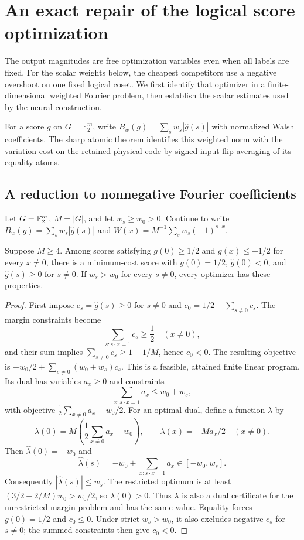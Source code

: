 \section{An exact repair of the logical score optimization}
\label{sec:repair}

The output magnitudes are free optimization variables even when all
labels are fixed. For the scalar weights below, the cheapest competitors
use a negative overshoot on one fixed logical coset. We first identify
that optimizer in a finite-dimensional weighted Fourier problem, then
establish the scalar estimates used by the neural construction.

For a score $g$ on $G=\mathbb F_2^m$, write
$B_w(g)=\sum_s w_s|\widehat g(s)|$ with normalized Walsh coefficients.
The sharp atomic theorem identifies this weighted norm with the
variation cost on the retained physical code by signed input-flip
averaging of its equality atoms.

\subsection{A reduction to nonnegative Fourier coefficients}

Let $G=\mathbb F_2^m$, $M=|G|$, and let $w_s\ge w_0>0$. Continue to write
$B_w(g)=\sum_s w_s|\widehat g(s)|$ and
$W(x)=M^{-1}\sum_s w_s(-1)^{s\cdot x}$.

\begin{lemma}\label{lem:positive-coeff}
Suppose $M\ge4$. Among scores satisfying $g(0)\ge1/2$ and
$g(x)\le-1/2$ for every $x\ne0$, there is a minimum-cost score with
$g(0)=1/2$, $\widehat g(0)<0$, and $\widehat g(s)\ge0$ for $s\ne0$.
If $w_s>w_0$ for every $s\ne0$, every optimizer has these properties.
\end{lemma}
\begin{proof}
First impose $c_s=\widehat g(s)\ge0$ for $s\ne0$ and
$c_0=1/2-\sum_{s\ne0}c_s$. The margin constraints become
\[
 \sum_{s:s\cdot x=1}c_s\ge\frac12\quad(x\ne0),
\]
and their sum implies $\sum_{s\ne0}c_s\ge1-1/M$, hence $c_0<0$.
The resulting objective is
$-w_0/2+\sum_{s\ne0}(w_0+w_s)c_s$.
This is a feasible, attained finite linear program. Its dual has
variables $a_x\ge0$ and constraints
\[
 \sum_{x:s\cdot x=1}a_x\le w_0+w_s,
\]
with objective $\frac12\sum_{x\ne0}a_x-w_0/2$.
For an optimal dual, define a function $\lambda$ by
\[
 \lambda(0)=M\left(\frac12\sum_{x\ne0}a_x-w_0\right),\qquad
 \lambda(x)=-Ma_x/2\quad(x\ne0).
\]
Then $\widehat\lambda(0)=-w_0$ and
\[
 \widehat\lambda(s)=-w_0+\sum_{x:s\cdot x=1}a_x\in[-w_0,w_s].
\]
Consequently $|\widehat\lambda(s)|\le w_s$. The restricted optimum
is at least $(3/2-2/M)w_0>w_0/2$, so $\lambda(0)>0$.
Thus $\lambda$ is also a dual certificate for the unrestricted
margin problem and has the same value. Equality forces $g(0)=1/2$
and $c_0\le0$. Under strict $w_s>w_0$, it also excludes negative
$c_s$ for $s\ne0$; the summed constraints then give $c_0<0$.
\end{proof}

